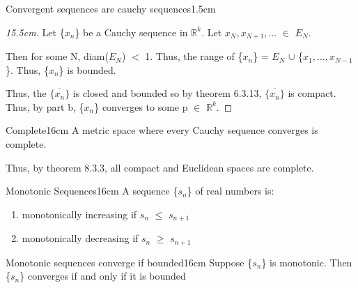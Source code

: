 \begin{ltheorem}{Convergent sequences are cauchy sequences}{1.5cm}
            \begin{proof}[15.5cm]
                Let \{$x_n$\} be a Cauchy sequence in $\mathbb{R}^k$.
				Let $x_N, x_{N+1}, ... $ $\in$ $E_N$.

				Then for some N, diam($E_N$) $<$ 1.
				Thus, the range of \{$x_n$\}
                = $E_N$ $\cup$ \{$x_1, ... , x_{N-1}$\}.
				Thus, \{$x_n$\} is bounded.

				Thus, the $\overline{\{x_n\}}$ is closed and bounded so by
                {\color{red} theorem 6.3.13}, $\overline{\{x_n\}}$ is compact.
				Thus, by part b, \{$x_n$\} converges to some
                p $\in$ $\mathbb{R}^k$.
            \end{proof}
    \end{ltheorem}

    \newpage


    
    \begin{definition}{Complete}{16cm}
        A metric space where every Cauchy sequence converges
        is {\color{lblue} complete}.

		Thus, by {\color{red} theorem 8.3.3}, all compact and Euclidean
		spaces are complete.
    \end{definition}
    
    \vspace{0.5cm}



    \begin{definition}{Monotonic Sequences}{16cm}
        A sequence \{$s_n$\} of real numbers is:
    \end{definition}

	\begin{enumerate}[label=(\alph*), leftmargin=2cm, itemsep=0.1cm]
		\item {\color{lblue} monotonically increasing} if $s_n$ $\leq$ $s_{n+1}$
		
		\item {\color{lblue} monotonically decreasing} if $s_n$ $\geq$ $s_{n+1}$
	\end{enumerate}

    \vspace{0.5cm}



    \begin{wtheorem}{Monotonic sequences converge if bounded}{16cm}
        Suppose \{$s_n$\} is monotonic. Then \{$s_n$\} converges if
		and only if it is bounded
    \end{wtheorem}
    
